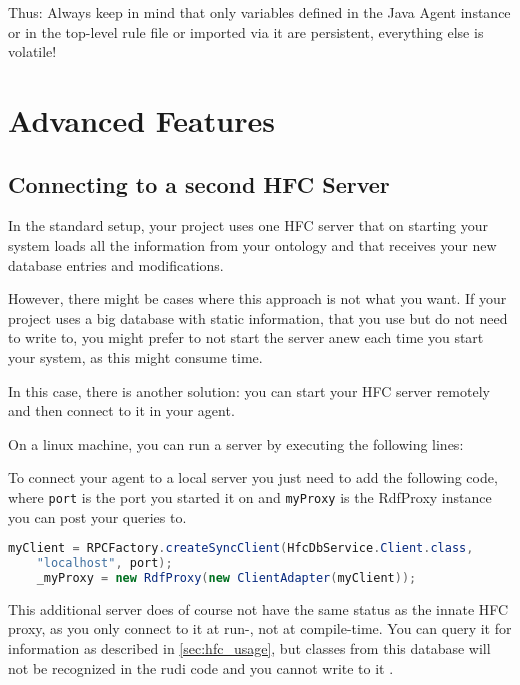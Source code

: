 Thus: Always keep in mind that only variables defined in the Java Agent instance or in the top-level rule file or imported via it are persistent, everything else is volatile!

\section{Advanced Features}

\subsection{Connecting to a second HFC Server} \label{sec:2ndHfc}
In the standard setup, your \vonda project uses one HFC server that on starting your system loads all the information from your ontology and that receives your new database entries and modifications.

However, there might be cases where this approach is not what you want. If your project uses a big database with static information, that you use but do not need to write to, you might prefer to not start the server anew each time you start your system, as this might consume time.


In this case, there is another solution: you can start your HFC server remotely and then connect to it in your \vonda agent.

On a linux machine, you can run a server by executing the following lines:

To connect your \vonda agent to a local server you just need to add the following code, where \texttt{port} is the port you started it on and \texttt{myProxy} is the RdfProxy instance you can post your queries to.

\begin{center}
	\begin{lstlisting}[language=Java]
	myClient = RPCFactory.createSyncClient(HfcDbService.Client.class,
	"localhost", port);
	_myProxy = new RdfProxy(new ClientAdapter(myClient));
	\end{lstlisting}
\end{center}

This additional server does of course not have the same status as the innate HFC proxy, as you only connect to it at run-, not at compile-time. You can query it for information as described in \ref{sec:hfc_usage}, but classes from this database will not be recognized in the rudi code and you cannot write to it . 

